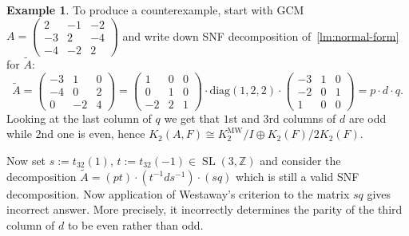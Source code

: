 \documentclass[oneside, 10pt]{amsart}
\theoremstyle{plain}
\theoremstyle{remark}
\theoremstyle{definition}
\newtheorem{example}{Example} \Crefname{example}{Example}{Examples}
\DeclareMathOperator{\SL}{SL}
\newcommand{\ZZ}{\mathbb{Z}}
\newcommand{\K}{K_2}
\newcommand{\Kmw}{K^{\mathrm{MW}}_2}
\begin{document}
\begin{example}
To produce a counterexample, start with GCM 
 $A = \left(\begin{smallmatrix}
 2& -1& -2\\
-3& 2& -4\\
-4& -2& 2\end{smallmatrix}\right)$
  and write down SNF decomposition of~\cref{lm:normal-form} for $\widetilde{A}$:
\[\widetilde{A} = \left(\begin{smallmatrix}
-3& 1& 0 \\
-4& 0& 2 \\
 0& -2& 4
\end{smallmatrix} \right) = \left(\begin{smallmatrix}
 1& 0& 0\\
 0& 1& 0\\
-2& 2& 1\end{smallmatrix}\right) \cdot \mathrm{diag}(1,2,2) \cdot \left(\begin{smallmatrix}
-3& 1& 0\\
-2& 0& 1\\
 1& 0& 0 \end{smallmatrix}\right) = p \cdot d \cdot q.\]
Looking at the last column of $q$ we get that $1$st and $3$rd columns of $d$ are odd while $2$nd one is even,
 hence $\K(A, F) \cong \Kmw/I \oplus \K(F)/2\K(F)$.

Now set $s:= t_{32}(1)$, $t:= t_{32}(-1) \in \SL(3, \ZZ)$ and consider the decomposition 
$\widetilde{A} = (p t) \cdot (t^{-1} d s^{-1}) \cdot (s q)$ which is still a valid SNF decomposition.
Now application of Westaway's criterion to the matrix $sq$ gives incorrect answer.
More precisely, it incorrectly determines the parity of the third column of $d$ to be even rather than odd.
\end{example}

\printbibliography
\end{document}
